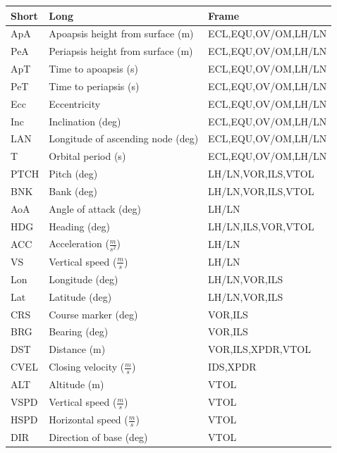 \documentclass[paper=a4, 11 pt]{report}
\begin{document}
\begin{center}
\begin{tabular}{ |l  l  l| }
  \hline
  \textbf{Short} & \textbf{Long} & \textbf{Frame} \\ \hline
   ApA & Apoapsis height from surface (m) & ECL,EQU,OV/OM,LH/LN \\ \hline
   PeA & Periapsis height from surface (m) & ECL,EQU,OV/OM,LH/LN \\ \hline
   ApT & Time to apoapsis (s) & ECL,EQU,OV/OM,LH/LN \\ \hline
   PeT & Time to periapsis (s) & ECL,EQU,OV/OM,LH/LN \\ \hline
   Ecc & Eccentricity & ECL,EQU,OV/OM,LH/LN \\ \hline
   Inc & Inclination (deg) & ECL,EQU,OV/OM,LH/LN \\ \hline
   LAN & Longitude of ascending node (deg) & ECL,EQU,OV/OM,LH/LN \\ \hline
   T & Orbital period (s) & ECL,EQU,OV/OM,LH/LN \\ \hline
   PTCH & Pitch (deg) & LH/LN,VOR,ILS,VTOL \\ \hline
   BNK & Bank (deg) & LH/LN,VOR,ILS,VTOL \\ \hline
   AoA & Angle of attack (deg) & LH/LN \\ \hline
   HDG & Heading (deg) & LH/LN,ILS,VOR,VTOL \\ \hline
   ACC & Acceleration ($\frac{m}{s^2}$) & LH/LN \\ \hline
   VS & Vertical speed ($\frac{m}{s}$) & LH/LN \\ \hline
   Lon & Longitude (deg) & LH/LN,VOR,ILS \\ \hline
   Lat & Latitude (deg) & LH/LN,VOR,ILS \\ \hline
   CRS & Course marker (deg) & VOR,ILS \\ \hline
   BRG & Bearing (deg) & VOR,ILS \\ \hline
   DST & Distance (m) & VOR,ILS,XPDR,VTOL \\ \hline
   CVEL & Closing velocity ($\frac{m}{s}$) & IDS,XPDR \\ \hline
   ALT & Altitude (m) & VTOL \\ \hline
   VSPD & Vertical speed ($\frac{m}{s}$) & VTOL \\ \hline
   HSPD & Horizontal speed ($\frac{m}{s}$) & VTOL \\ \hline
   DIR & Direction of base (deg) & VTOL \\ \hline
\end{tabular}
\end{center}

%
\end{document}
